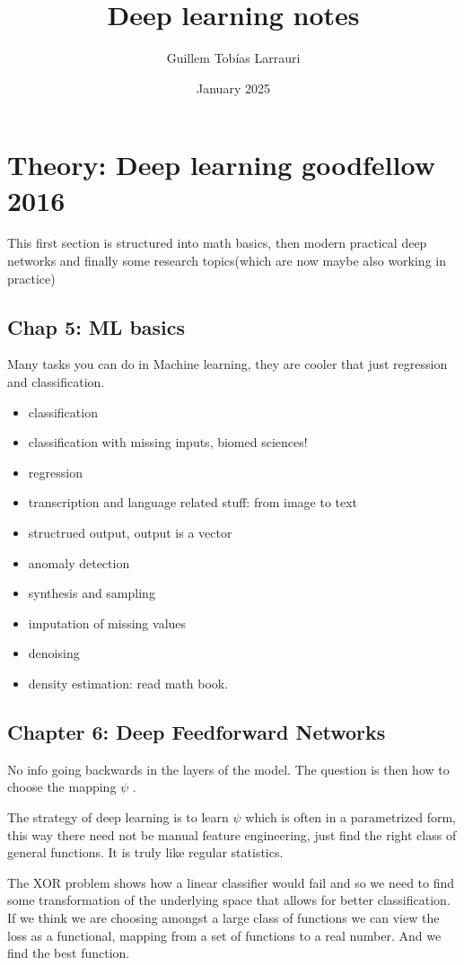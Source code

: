 \documentclass{article}
\title{Deep learning notes}
\author{Guillem Tobías Larrauri}
\date{January 2025}
\begin{document}
\maketitle


\section{Theory: Deep learning goodfellow 2016}
This first section is structured into math basics, then modern practical deep networks
and finally some research topics(which are now maybe also working in practice)
\subsection{Chap 5: ML basics}
Many tasks you can do in Machine learning, they are cooler that just regression and classification.

\begin{itemize}
    \item classification
    \item classification with missing inputs, biomed sciences!
    \item regression
    \item transcription and language related stuff: from image to text
    \item structrued output, output is a vector
    \item anomaly detection
    \item synthesis and sampling
    \item imputation of missing values
    \item denoising
    \item density estimation: read math book.
\end{itemize}


\subsection{Chapter 6: Deep Feedforward Networks}

No info going backwards in the layers of the model.
The question is then how to choose the mapping $\psi$ .

The strategy of deep learning is to learn $\psi$ which is often in a parametrized form,
this way there need not be manual feature engineering, just find the right class of general functions. It is truly like regular statistics.

The XOR problem shows how a linear classifier would fail and so we need to find some transformation of the underlying space that allows for better classification.
If we think we are choosing amongst a large class of functions we can view the loss as a functional, mapping from a set of functions to a real number. And we find the best function.
\end{document}
